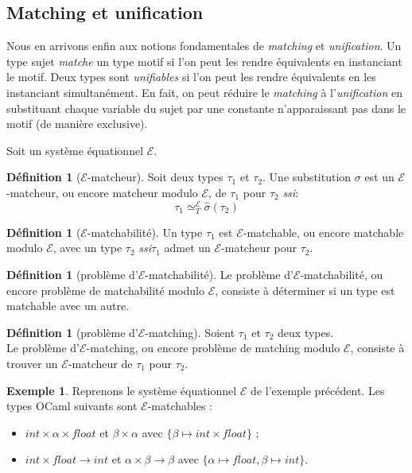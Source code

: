 \documentclass[a4paper]{report}
\theoremstyle{definition}
\newtheorem{definition}[theoreme]{Définition}
\newtheorem{exemple}[theoreme]{Exemple}
\newcommand{\ssi}{\textit{ssi}\xspace}
\newcommand{\E}{\mathscr E}
\newcommand{\Tequiv}{\simeq_T}
\newcommand{\TEequiv}{\Tequiv^\E}
\begin{document}

\subsection{Matching et unification}

Nous en arrivons enfin aux notions fondamentales de \emph{matching} et \emph{unification}. Un type sujet \emph{matche} un type motif si l'on peut les rendre équivalents en instanciant le motif. Deux types sont \emph{unifiables} si l'on peut les rendre équivalents en les instanciant simultanément. En fait, on peut réduire le \emph{matching} à l'\emph{unification} en substituant chaque variable du sujet par une constante n'apparaissant pas dans le motif (de manière exclusive).

Soit un système équationnel $\E$.

\begin{definition}[$\E$-matcheur]
	Soit deux types $\tau_1$ et $\tau_2$.
	Une substitution $\sigma$ est un $\E$-matcheur, ou encore matcheur modulo $\E$, de $\tau_1$ pour $\tau_2$ \ssi :
	\[ \tau_1 \TEequiv \hat \sigma (\tau_2) \]
\end{definition}

\begin{definition}[$\E$-matchabilité]
	Un type $\tau_1$ est $\E$-matchable, ou encore matchable modulo $\E$, avec un type $\tau_2$ \ssi $\tau_1$ admet un $\E$-matcheur pour $\tau_2$.
\end{definition}

\begin{definition}[problème d'$\E$-matchabilité]
	Le problème d'$\E$-matchabilité, ou encore problème de matchabilité modulo $\E$, consiste à déterminer si un type est matchable avec un autre.
\end{definition}

\begin{definition}[problème d'$\E$-matching]
	Soient $\tau_1$ et $\tau_2$ deux types. \\
	Le problème d'$\E$-matching, ou encore problème de matching modulo $\E$, consiste à trouver un $\E$-matcheur de $\tau_1$ pour $\tau_2$.
\end{definition}

\begin{exemple}
	Reprenons le système équationnel $\E$ de l'exemple précédent. Les types OCaml suivants sont $\E$-matchables :
	\begin{itemize}
		\item $int \times \alpha \times float$ et $\beta \times \alpha$ avec $\{ \beta \mapsto int \times float \}$ ;
		\item $int \times float \rightarrow int$ et $\alpha \times \beta \rightarrow \beta$ avec $\{ \alpha \mapsto float, \beta \mapsto int \}$.
	\end{itemize}
\end{exemple}
\end{document}
